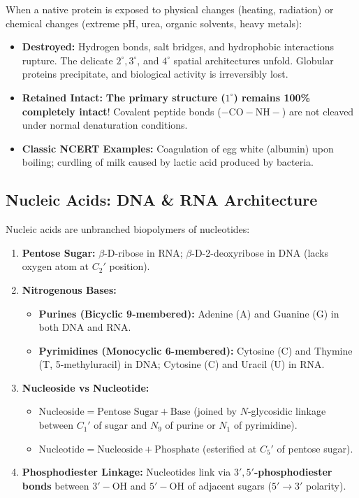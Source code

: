 \documentclass[10pt,twoside,openright]{book}
\begin{document}
\begin{trapbox}
When a native protein is exposed to physical changes (heating, radiation) or chemical changes (extreme pH, urea, organic solvents, heavy metals):
\begin{itemize}
  \item \textbf{Destroyed:} Hydrogen bonds, salt bridges, and hydrophobic interactions rupture. The delicate $2^\circ, 3^\circ$, and $4^\circ$ spatial architectures unfold. Globular proteins precipitate, and biological activity is irreversibly lost.
  \item \textbf{Retained Intact:} \textbf{The primary structure ($1^\circ$) remains 100\% completely intact}! Covalent peptide bonds ($-\mathrm{CO-NH}-$) are not cleaved under normal denaturation conditions.
  \item \textbf{Classic NCERT Examples:} Coagulation of egg white (albumin) upon boiling; curdling of milk caused by lactic acid produced by bacteria.
\end{itemize}
\end{trapbox}

\subsection{Nucleic Acids: DNA \& RNA Architecture}

\begin{conceptbox}
Nucleic acids are unbranched biopolymers of nucleotides:
\begin{enumerate}[leftmargin=*]
  \item \textbf{Pentose Sugar:} $\beta$-D-ribose in RNA; $\beta$-D-2-deoxyribose in DNA (lacks oxygen atom at $C_2'$ position).
  \item \textbf{Nitrogenous Bases:}
  \begin{itemize}
    \item \textbf{Purines (Bicyclic 9-membered):} Adenine (A) and Guanine (G) in both DNA and RNA.
    \item \textbf{Pyrimidines (Monocyclic 6-membered):} Cytosine (C) and Thymine (T, 5-methyluracil) in DNA; Cytosine (C) and Uracil (U) in RNA.
  \end{itemize}
  \item \textbf{Nucleoside vs Nucleotide:}
  \begin{itemize}
    \item $\text{Nucleoside} = \text{Pentose Sugar} + \text{Base}$ (joined by $N$-glycosidic linkage between $C_1'$ of sugar and $N_9$ of purine or $N_1$ of pyrimidine).
    \item $\text{Nucleotide} = \text{Nucleoside} + \text{Phosphate}$ (esterified at $C_5'$ of pentose sugar).
  \end{itemize}
  \item \textbf{Phosphodiester Linkage:} Nucleotides link via \textbf{$3',5'$-phosphodiester bonds} between $3'-\mathrm{OH}$ and $5'-\mathrm{OH}$ of adjacent sugars ($5' \to 3'$ polarity).
\end{enumerate}
\end{conceptbox}
\end{document}
